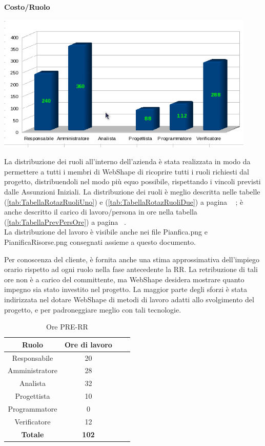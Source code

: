 \begin{center}\textbf{Costo/Ruolo}
\end{center}
\includegraphics[width=350pt]{RQ_RA_Costi}

La distribuzione dei ruoli all'interno dell'azienda \`e stata realizzata in modo da permettere a tutti i membri di WebShape di ricoprire tutti i ruoli richiesti dal progetto, distribuendoli nel modo pi\`u equo possibile, rispettando i vincoli previsti dalle Assunzioni Iniziali. La distribuzione dei ruoli \`e meglio descritta nelle tabelle (\ref{tab:TabellaRotazRuoliUno}) e (\ref{tab:TabellaRotazRuoliDue}) a pagina ~\pageref{tab:TabellaRotazRuoliUno} ; \`e anche descritto il carico di lavoro/persona in ore nella tabella (\ref{tab:TabellaPrevPersOre}) a pagina ~\pageref{tab:TabellaPrevPersOre}.\\
La distribuzione del lavoro \`e visibile anche nei file Pianfica.png e PianificaRisorse.png consegnati assieme a questo documento.

Per conoscenza del cliente, \`e fornita anche una stima approssimativa dell'impiego orario rispetto ad ogni ruolo nella fase antecedente la RR. La retribuzione di tali ore non \`e a carico del committente, ma WebShape desidera mostrare quanto impegno sia stato investito nel progetto. La maggior parte degli sforzi \`e stata indirizzata nel dotare WebShape di metodi di lavoro adatti allo svolgimento del progetto, e per padroneggiare meglio con tali tecnologie.\\

\begin{table}[h]
	\begin{center}
		  \begin{tabular}{|c|c|c|c|}
		 \hline 
		 \textbf{Ruolo} & \textbf{Ore di lavoro} \\
		 \hline
		Responsabile & 20 \\
		Amministratore & 28 \\
		Analista & 32 \\
		Progettista & 10 \\
		Programmatore & 0 \\
		Verificatore & 12 \\
        \hline
        \textbf{Totale} & \textbf{102} \\
		\hline
		\end{tabular}
	\caption{Ore PRE-RR} 
	\label{tab:tabella_PRE_RR}
	\end{center}	
\end{table}

